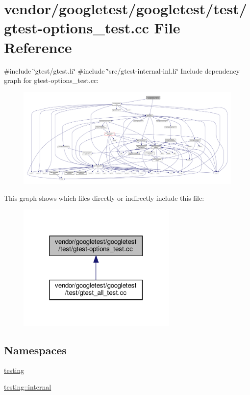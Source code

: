 \hypertarget{gtest-options__test_8cc}{}\section{vendor/googletest/googletest/test/gtest-\/options\+\_\+test.cc File Reference}
\label{gtest-options__test_8cc}
{\ttfamily \#include \char`\"{}gtest/gtest.\+h\char`\"{}}\newline
{\ttfamily \#include \char`\"{}src/gtest-\/internal-\/inl.\+h\char`\"{}}\newline
Include dependency graph for gtest-\/options\+\_\+test.cc\+:
\nopagebreak
\begin{figure}[H]
\begin{center}
\leavevmode
\includegraphics[width=350pt]{gtest-options__test_8cc__incl}
\end{center}
\end{figure}
This graph shows which files directly or indirectly include this file\+:
\nopagebreak
\begin{figure}[H]
\begin{center}
\leavevmode
\includegraphics[width=222pt]{gtest-options__test_8cc__dep__incl}
\end{center}
\end{figure}
\subsection*{Namespaces}
\begin{DoxyCompactItemize}
\item 
 \hyperlink{namespacetesting}{testing}
\item 
 \hyperlink{namespacetesting_1_1internal}{testing\+::internal}
\end{DoxyCompactItemize}
